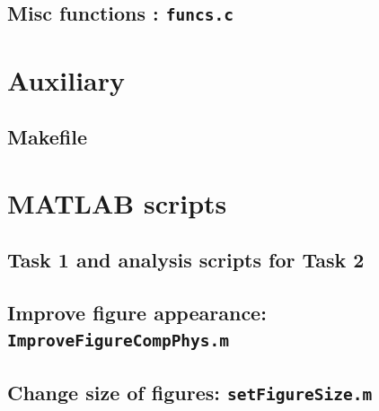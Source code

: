 \subsection{Misc functions : \texttt{funcs.c}}


\section{Auxiliary }
\subsection{Makefile}


\section{MATLAB scripts}
\subsection{Task 1 and analysis scripts for Task 2}


\subsection{Improve figure appearance: \texttt{ImproveFigureCompPhys.m}}


\subsection{Change size of figures: \texttt{setFigureSize.m}}



